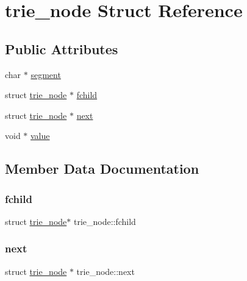 \hypertarget{structtrie__node}{}\section{trie\+\_\+node Struct Reference}
\label{structtrie__node}
\subsection*{Public Attributes}
\begin{DoxyCompactItemize}
\item 
char $\ast$ \mbox{\hyperlink{structtrie__node_a12084a8e8f390a22ed508767066eba93}{segment}}
\item 
struct \mbox{\hyperlink{structtrie__node}{trie\+\_\+node}} $\ast$ \mbox{\hyperlink{structtrie__node_a3d62444758444961b8529fdb15304ff5}{fchild}}
\item 
struct \mbox{\hyperlink{structtrie__node}{trie\+\_\+node}} $\ast$ \mbox{\hyperlink{structtrie__node_ab82cd7e4a2d8a10155add5b113a699c1}{next}}
\item 
void $\ast$ \mbox{\hyperlink{structtrie__node_a7915ff25676c2c37fe54a7b3055cca6a}{value}}
\end{DoxyCompactItemize}


\subsection{Member Data Documentation}
\mbox{\label{structtrie__node_a3d62444758444961b8529fdb15304ff5}} 
\subsubsection{\texorpdfstring{fchild}{fchild}}
{\footnotesize\ttfamily struct \mbox{\hyperlink{structtrie__node}{trie\+\_\+node}}$\ast$ trie\+\_\+node\+::fchild}

\mbox{\label{structtrie__node_ab82cd7e4a2d8a10155add5b113a699c1}} 
\subsubsection{\texorpdfstring{next}{next}}
{\footnotesize\ttfamily struct \mbox{\hyperlink{structtrie__node}{trie\+\_\+node}} $\ast$ trie\+\_\+node\+::next}

